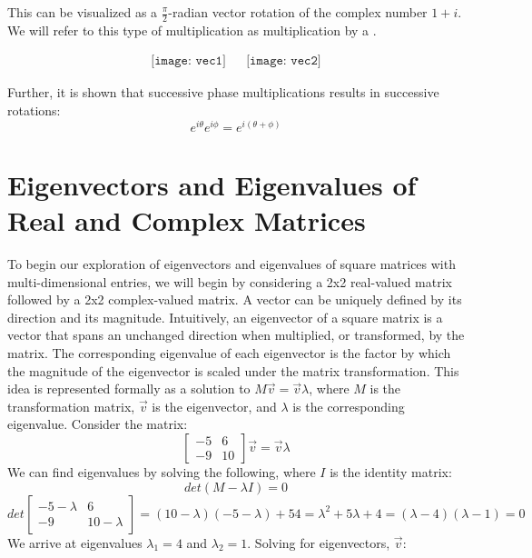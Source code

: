 \documentclass{article}
\theoremstyle{plain}
\begin{document}
This can be visualized as a $\frac{\pi}{2}$-radian vector rotation of the complex number $1+i$. We will refer to this type of multiplication as multiplication by a .

$$
\begin{array}{ccc}
\texttt{[image: vec1]}
& & 
\texttt{[image: vec2]}
\end{array}$$

Further, it is shown that successive phase multiplications results in successive rotations:
$$e^{i\theta}e^{i\phi}=e^{i(\theta+\phi)}$$
\section{Eigenvectors and Eigenvalues of Real and Complex Matrices}
To begin our exploration of eigenvectors and eigenvalues of square matrices with multi-dimensional entries, we will begin by considering a 2x2 real-valued matrix followed by a 2x2 complex-valued matrix. A vector can be uniquely defined by its direction and its magnitude. Intuitively, an eigenvector of a square matrix is a vector that spans an unchanged direction when multiplied, or transformed, by the matrix. The corresponding eigenvalue of each eigenvector is the factor by which the magnitude of the eigenvector is scaled under the matrix transformation. This idea is represented formally as a solution to $M\vec{v}=\vec{v}\lambda$, where $M$ is the transformation matrix, $\vec{v}$ is the eigenvector, and $\lambda$ is the corresponding eigenvalue. Consider the matrix: 
$$
\begin{bmatrix}
-5 & 6\\
-9 & 10
\end{bmatrix}\vec{v}=\vec{v}\lambda
$$
We can find eigenvalues by solving the following, where $I$ is the identity matrix:
$$det(M-\lambda I) = 0$$
$$det\begin{bmatrix}
-5-\lambda & 6\\
-9 & 10-\lambda
\end{bmatrix}=(10-\lambda)(-5-\lambda)+54=\lambda^2+5\lambda+4=(\lambda-4)(\lambda-1)=0$$
We arrive at eigenvalues $\lambda_1 = 4$ and $\lambda_2=1$. Solving for eigenvectors, $\vec{v}$:
\end{document}
